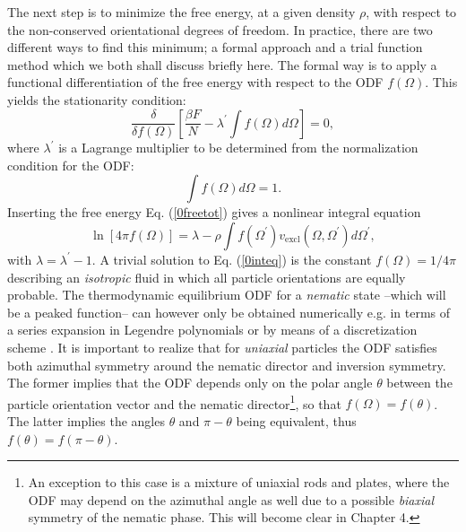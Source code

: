 {The next step is to minimize the free energy, at a given density $\rho$, with respect to
the non-conserved orientational degrees of freedom.
In practice, there are two different ways to find this minimum; a formal approach and
a trial function method which we both shall discuss briefly here.
 The formal way  is to apply a functional differentiation of the free energy
with respect to the ODF $f(\Omega)$. This yields the stationarity condition:
\begin{equation}
\frac{\delta}{\delta f(\Omega)} \left[\frac{\beta F}{N}-\lambda^{\prime} \int f(\Omega)d \Omega \right]=0,
\label{0statcond}
\end{equation}
where $\lambda^{\prime}$ is a Lagrange multiplier to be determined from the
normalization condition for the ODF:
\begin{equation}
\int f(\Omega)d\Omega =1.
\end{equation}
Inserting the free energy Eq. (\ref{0freetot}) gives a nonlinear integral equation
\begin{equation}
\ln[4\pi f(\Omega)]=\lambda - \rho \int f(\Omega^{\prime})v_{\text{excl}}(\Omega,\Omega^{\prime})
d\Omega^{\prime}, \label{0inteq}
\end{equation}
with $\lambda=\lambda^{\prime}-1$. A trivial solution to Eq. (\ref{0inteq}) is
the constant $f(\Omega)=1/4\pi$ describing an {\em isotropic} fluid in which
all particle orientations are equally probable.
The thermodynamic equilibrium ODF for a {\em nematic} state --which
will be a peaked function--
can however only be obtained
 numerically e.g. in terms of a series expansion in
Legendre polynomials \cite{kayser,lasher,lakatos} or by means of a discretization scheme \cite{herzfeldgrid}.
It is important to realize that for  {\em uniaxial} particles the ODF satisfies
both azimuthal symmetry around the nematic director and inversion symmetry.
The former implies that the ODF depends only on the  polar angle $\theta$
between the particle orientation vector and the nematic director\footnote{An exception to this case is a mixture of uniaxial rods and plates,
where the ODF may depend on the azimuthal angle as well
due to a possible {\em biaxial} symmetry of the nematic phase.
This will become clear in Chapter 4.}, so that $f(\Omega)=f(\theta)$.
The latter  implies the angles $\theta$ and $\pi-\theta$ being equivalent, thus $f(\theta)=f(\pi-\theta)$.



}
